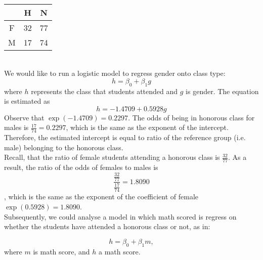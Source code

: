 \documentclass{article}
\begin{document}
\\
\begin{tabular}{|c|c|c|}
\hline 
& H & N \\ 
\hline 
F & 32 & 77 \\ 
\hline 
M & 17 & 74 \\
\hline 
\end{tabular} 
\\
We would like to run a logistic model to regress gender onto class type:
\begin{equation}
 h = \beta_0 + \beta_1g
\end{equation}
where $h$ represents the class that students attended and $g$ is gender.
The equation is estimated as
\begin{equation}
 h = -1.4709 + 0.5928g
\end{equation}
Observe that $\exp(-1.4709) = 0.2297$. The odds of being in honorous class for males is $\frac{17}{74}=0.2297 $, which is the same as the exponent of the intercept. Therefore, the estimated intercept is equal to ratio of the reference group (i.e. male) belonging to the honorous class.
\\
\indent Recall, that the ratio of female students attending a honorous class is $\frac{32}{77}$. As a result, the ratio of the odds of females to males is 
\begin{equation}
 \frac{\frac{32}{77}}{\frac{17}{74}} = 1.8090
\end{equation}, which is the same as the exponent of the coefficient of female $\exp(0.5928) = 1.8090$.
\\
\indent
Subsequently, we could analyse a model in which math scored is regress on whether the students have attended a honorous class or not, as in:

\begin{equation}
 h = \beta_0 + \beta_1m  ,
\end{equation}
where $m$ is math score, and $h$ a math score.

\end{document}

